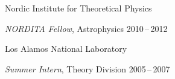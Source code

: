 \noindent
Nordic Institute for Theoretical Physics
\vspace{3pt}
\begin{blist}
\item[] \textit{NORDITA Fellow}, Astrophysics \hfill 2010\,--\,2012
\end{blist}
\vspace{3pt}

\noindent
Los Alamos National Laboratory
\vspace{3pt}
\begin{blist}
\item[] \textit{Summer Intern}, Theory Division \hfill 2005\,--\,2007
\end{blist}
